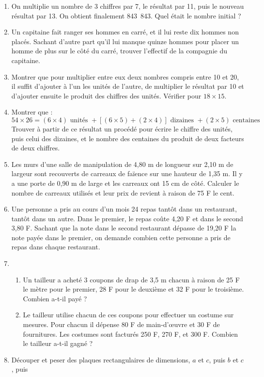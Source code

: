 \documentclass[12 pt]{extarticle}
\theoremstyle{plain}
\begin{document}
\begin{enumerate}
\item On multiplie un nombre de 3 chiffres par 7, le résultat par 11, puis le nouveau résultat par 13. On obtient finalement 843~843. Quel était le nombre initial ? 
\item Un capitaine fait ranger ses hommes en carré, et il lui reste dix hommes non placés. Sachant d'autre part qu'il lui manque quinze hommes pour placer un homme de plus sur le côté du carré, trouver l'effectif de la compagnie du capitaine. 
\item Montrer que pour multiplier entre eux deux nombres compris entre 10 et 20, il suffit d'ajouter à l'un les unités de l'autre, de multiplier le résultat par 10 et d'ajouter ensuite le produit des chiffres des unités. Vérifier pour $18 \times 15$. 
\item Montrer que : 
\[ 54 \times 26 = (6 \times 4) \text{ unités } + 
[(6 \times 5) + (2 \times 4) ]\text{ dizaines } + 
(2 \times 5) \text{ centaines } \]
Trouver à partir de ce résultat un procédé pour écrire le chiffre des unités, puis celui des dizaines, et le nombre des centaines du produit de deux facteurs de deux chiffres. 
\item Les murs d'une salle de manipulation de 
4,80 m de longueur sur 2,10 m de largeur sont recouverts de carreaux de faïence sur une hauteur de 1,35 m. Il y a une porte de 0,90 m de large et les carreaux ont 15 cm de côté. Calculer le nombre de carreaux utilisés et leur prix de revient à raison 
de 75 F le cent. 
\item Une personne a pris au cours d'un mois 24 repas
tantôt dans un restaurant, tantôt dans un autre. Dans 
le premier, le repas coûte 4,20 F et dans le second
3,80 F. Sachant que la note dans le second restaurant
dépasse de 19,20 F la note payée dans le premier, on demande combien cette personne a pris de repas dans chaque restaurant. 
\item \begin{enumerate}
\item Un tailleur a acheté 3 coupons de drap de 3,5 m
chacun à raison de 25 F le mètre pour le premier, 28 F
pour le deuxième et 32 F pour le troisième. Combien
a-t-il payé ? 
\item Le tailleur utilise chacun de ces coupons pour 
effectuer un costume sur mesures. Pour chacun il 
dépense 80 F de main-d'œuvre et 30 F de fournitures.
Les costumes sont facturés 250 F, 270 F, et 300 F. 
Combien le tailleur a-t-il gagné ? 
\end{enumerate}
\item Découper et peser des plaques rectangulaires de dimensions, $a$ et $c$, puis $b$ et $c$, puis 

\end{enumerate}
\end{document}
